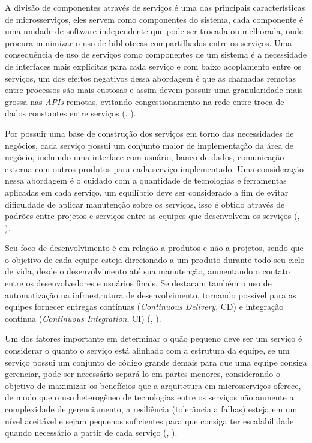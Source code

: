 \documentclass[]{politex}
\begin{document}
A divisão de componentes através de serviços é uma das principais características de microsserviços, eles servem como componentes do sistema, cada componente é uma unidade de software independente que pode ser trocada ou melhorada, onde procura minimizar o uso de bibliotecas compartilhadas entre os serviços. Uma consequência de uso de serviços como componentes de um sistema é a necessidade de interfaces mais explícitas para cada serviço e com baixo acoplamento entre os serviços, um dos efeitos negativos dessa abordagem é que as chamadas remotas entre processos são mais custosas e assim devem possuir uma granularidade mais grossa nas \textit{APIs} remotas, evitando congestionamento na rede entre troca de dados constantes entre serviços (, \citeyear{martinfowler2014microservices}).

Por possuir uma base de construção dos serviços em torno das necessidades de negócios, cada serviço possui um conjunto maior de implementação da área de negócio, incluindo uma interface com usuário, banco de dados, comunicação externa com outros produtos para cada serviço implementado. Uma consideração nessa abordagem é o cuidado com a quantidade de tecnologias e ferramentas aplicadas em cada serviço, um equilíbrio deve ser considerado a fim de evitar dificuldade de aplicar manutenção sobre os serviços, isso é obtido através de padrões entre projetos e serviços entre as equipes que desenvolvem os serviços (, \citeyear{martinfowler2014microservices}).

Seu foco de desenvolvimento é em relação a produtos e não a projetos, sendo que o objetivo de cada equipe esteja direcionado a um produto durante todo seu ciclo de vida, desde o desenvolvimento até sua manutenção, aumentando o contato entre os desenvolvedores e usuários finais. Se destacam também o uso de automatização na infraestrutura de desenvolvimento, tornando possível para as equipes fornecer entregas contínuas (\textit{Continuous Delivery}, CD) e integração contínua (\textit{Continuous Integration}, CI) (, \citeyear{martinfowler2014microservices}).

Um dos fatores importante em determinar o quão pequeno deve ser um serviço é considerar o quanto o serviço está alinhado com a estrutura da equipe, se um serviço possui um conjunto de código grande demais para que uma equipe consiga gerenciar, pode ser necessário separá-lo em partes menores, considerando o objetivo de maximizar os benefícios que a arquitetura em microsserviços oferece, de modo que o uso heterogêneo de tecnologias entre os serviços não aumente a complexidade de gerenciamento, a resiliência (tolerância a falhas) esteja em um nível aceitável e sejam pequenos suficientes para que consiga ter escalabilidade quando necessário a partir de cada serviço (, \citeyear{Newman}).
\end{document}
